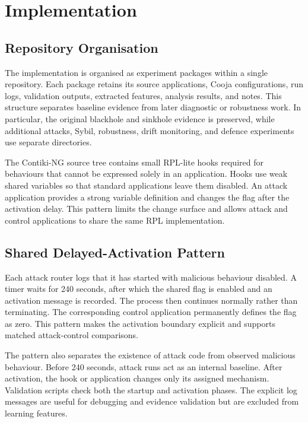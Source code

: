 \chapter{Implementation}
\label{chap:implementation}

\section{Repository Organisation}

The implementation is organised as experiment packages within a single repository. Each package retains its source applications, Cooja configurations, run logs, validation outputs, extracted features, analysis results, and notes. This structure separates baseline evidence from later diagnostic or robustness work. In particular, the original blackhole and sinkhole evidence is preserved, while additional attacks, Sybil, robustness, drift monitoring, and defence experiments use separate directories.

The Contiki-NG source tree contains small RPL-lite hooks required for behaviours that cannot be expressed solely in an application. Hooks use weak shared variables so that standard applications leave them disabled. An attack application provides a strong variable definition and changes the flag after the activation delay. This pattern limits the change surface and allows attack and control applications to share the same RPL implementation.

\section{Shared Delayed-Activation Pattern}

Each attack router logs that it has started with malicious behaviour disabled. A timer waits for 240 seconds, after which the shared flag is enabled and an activation message is recorded. The process then continues normally rather than terminating. The corresponding control application permanently defines the flag as zero. This pattern makes the activation boundary explicit and supports matched attack-control comparisons.

The pattern also separates the existence of attack code from observed malicious behaviour. Before 240 seconds, attack runs act as an internal baseline. After activation, the hook or application changes only its assigned mechanism. Validation scripts check both the startup and activation phases. The explicit log messages are useful for debugging and evidence validation but are excluded from learning features.


